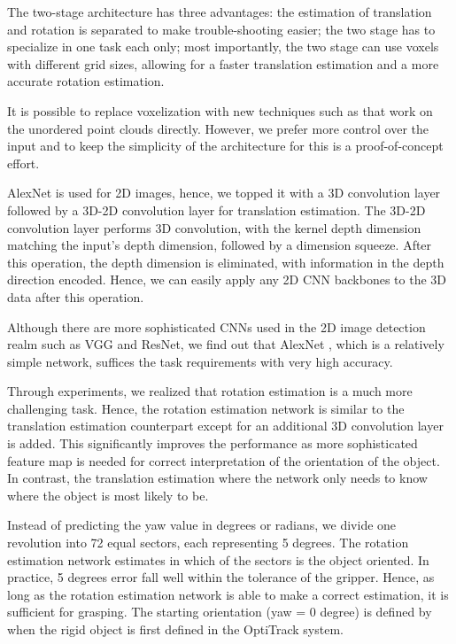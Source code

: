 \documentclass[conference]{IEEEtran}
\begin{document}
The two-stage architecture has three advantages: the estimation of translation and rotation is separated to make trouble-shooting easier; the two stage has to specialize in one task each only; most importantly, the two stage can use voxels with different grid sizes, allowing for a faster translation estimation and a more accurate rotation estimation.

It is possible to replace voxelization with new techniques such as \cite{qi_2018_cvpr} that work on the unordered point clouds directly. However, we prefer more control over the input and to keep the simplicity of the architecture for this is a proof-of-concept effort.

AlexNet is used for 2D images, hence, we topped it with a 3D convolution layer followed by a 3D-2D convolution layer for translation estimation. The 3D-2D convolution layer performs 3D convolution, with the kernel depth dimension matching the input's depth dimension, followed by a dimension squeeze. After this operation, the depth dimension is eliminated, with information in the depth direction encoded. Hence, we can easily apply any 2D CNN backbones to the 3D data after this operation.

Although there are more sophisticated CNNs used in the 2D image detection realm such as VGG and ResNet, we find out that AlexNet \cite{krizhevsky_2012_nips}, which is a relatively simple network, suffices the task requirements with very high accuracy.

Through experiments, we realized that rotation estimation is a much more challenging task. Hence, the rotation estimation network is similar to the translation estimation counterpart except for an additional 3D convolution layer is added. This significantly improves the performance as more sophisticated feature map is needed for correct interpretation of the orientation of the object. In contrast, the translation estimation where the network only needs to know where the object is most likely to be.

Instead of predicting the yaw value in degrees or radians, we divide one revolution into 72 equal sectors, each representing 5 degrees. The rotation estimation network estimates in which of the sectors is the object oriented. In practice, 5 degrees error fall well within the tolerance of the gripper. Hence, as long as the rotation estimation network is able to make a correct estimation, it is sufficient for grasping. The starting orientation (yaw = 0 degree) is defined by when the rigid object is first defined in the OptiTrack system.
\end{document}
